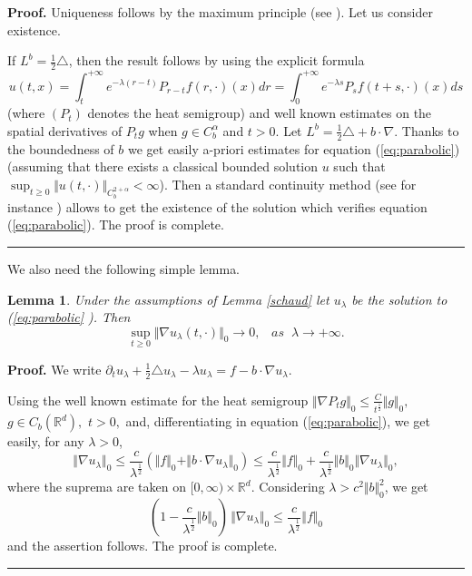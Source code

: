 \documentclass[a4paper,10pt]{article}
\newtheorem{lemma}[theorem]{Lemma}
\newenvironment{proof}[1][Proof]{\textbf{#1.} }{\ \rule{0.5em}{0.5em}}
\begin{document}
\begin{proof}
Uniqueness follows by the maximum principle (see \cite{Kr}). Let us consider existence.

If
   $L^{b}=\frac{1}{2}\triangle$, then the result follows
by using the explicit formula
\begin{equation}
u(t,x)=\int_{t}^{+\infty}e^{-\lambda(r-t)}P_{r-t}f(r,\cdot)(x)dr=\int
_{0}^{+\infty}e^{-\lambda s}P_{s}f(t+s,\cdot)(x)ds \label{heat}%
\end{equation}
(where $(P_{t})$ denotes the heat semigroup) and well known
estimates on the spatial derivatives of $P_t g$ when $g \in
C^{\alpha}_b$ and $t>0$. Let
$L^{b}=\frac{1}{2}\triangle+b\cdot\nabla$. Thanks to the
boundedness of $b$ we get easily a-priori estimates for equation
(\ref{eq:parabolic}) (assuming that there exists a
 classical bounded solution $u$  such that
$\sup_{t\geq0}\Vert u(t,\cdot)\Vert_{C_{b}^{2+\alpha}}<\infty$).
Then a standard continuity method (see for instance \cite{Kr})
allows to get the existence of the solution which verifies
equation (\ref{eq:parabolic}). The proof is complete.
\end{proof}

\vskip 1mm  We also need the following simple lemma.


\begin{lemma}
\label{grad} Under the assumptions of Lemma \ref{schaud}
 let $u_{\lambda}$ be the solution to  (\ref{eq:parabolic}%
). Then
\[
\sup_{t\geq0}\Vert \nabla u_{\lambda}(t,\cdot)\Vert_{0}\rightarrow
0,\;\;\;as\;\;\lambda\rightarrow+\infty.
\]
\end{lemma}

\begin{proof}
We write $\partial_{t}u_{\lambda}+\frac{1}{2}\triangle u_{\lambda}-\lambda
u_{\lambda}=f-b\cdot\nabla u_{\lambda}.$

Using the well known estimate for the heat semigroup $\Vert\nabla P_{t}%
g\Vert_{0}\leq\frac{C}{t^{\frac{1}{2}}}\Vert g\Vert_{0},$ $g\in C_{b}%
({\mathbb{R}}^{d}),$ $t>0,$ and, differentiating in equation
(\ref{eq:parabolic}), we get easily, for any $\lambda>0$,
\[
\Vert\nabla u_{\lambda}\Vert_{0}\leq\frac{c}{\lambda^{\frac{1}{2}}}(\Vert
f\Vert_{0}+\Vert b\cdot\nabla u_{\lambda}\Vert_{0})\leq\frac{c}{\lambda
^{\frac{1}{2}}}\Vert f\Vert_{0}+\frac{c}{\lambda^{\frac{1}{2}}}\Vert
b\Vert_{0}\Vert\nabla u_{\lambda}\Vert_{0},
\]
where the suprema are taken on $[0,\infty)\times{\mathbb{R}}^{d}$. Considering
$\lambda>c^{2}\Vert b\Vert_{0}^{2}$, we get
\[
(1-\frac{c}{\lambda^{\frac{1}{2}}}\Vert b\Vert_{0})\,\Vert\nabla u_{\lambda
}\Vert_{0}\leq\frac{c}{\lambda^{\frac{1}{2}}}\Vert f\Vert_{0}%
\]
and the assertion follows. The proof is complete.
\end{proof}
\end{document}
